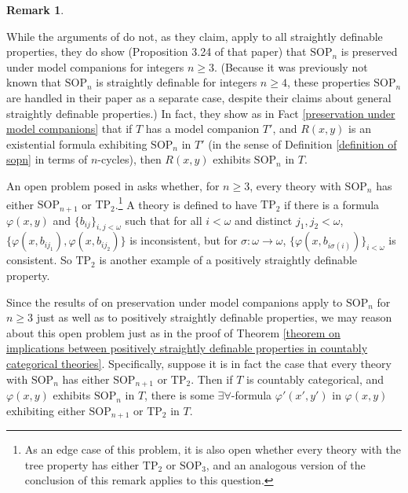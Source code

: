 \documentclass{article}
\theoremstyle{definition}
\theoremstyle{definition}
\theoremstyle{definition}
\newtheorem{remark}{Remark}
\begin{document}
\begin{remark}\label{preservation of sopn}

While the arguments of \cite{bodirsky2025taking} do not, as they claim, apply to all straightly definable properties, they do show (Proposition 3.24 of that paper) that $\mathrm{SOP}_{n}$ is preserved under model companions for integers $n \geq 3$. (Because it was previously not known that $\mathrm{SOP}_{n}$ is straightly definable for integers $n \geq 4$, these properties $\mathrm{SOP}_{n}$ are handled in their paper as a separate case, despite their claims about general straightly definable properties.) In fact, they show as in Fact \ref{preservation under model companions} that if $T$ has a model companion $T'$, and $R(x,y)$ is an existential formula exhibiting $\mathrm{SOP}_{n}$ in $T'$ (in the sense of Definition \ref{definition of sopn} in terms of $n$-cycles), then $R(x, y)$ exhibits $\mathrm{SOP}_{n}$ in $T$.


An open problem posed in \cite{chernikov2014theories} asks whether, for $n \geq 3$, every theory with $\mathrm{SOP}_{n}$ has either $\mathrm{SOP}_{n+1}$ or $\mathrm{TP}_{2}$.\footnote{As an edge case of this problem, it is also open whether every theory with the tree property has either $\mathrm{TP}_{2}$ or $\mathrm{SOP}_{3}$, and an analogous version of the conclusion of this remark applies to this question.} A theory is defined to have $\mathrm{TP}_{2}$ if there is a formula $\varphi(x, y)$ and $\{b_{ij}\}_{i, j < \omega}$ such that for all $i< \omega$ and distinct $j_{1}, j_{2}< \omega$, $\{\varphi(x, b_{ij_{1}}), \varphi(x, b_{ij_{2}})\}$ is inconsistent, but for $\sigma: \omega \to \omega$, $\{\varphi(x, b_{i\sigma(i)})\}_{i < \omega}$ is consistent. So $\mathrm{TP}_{2}$ is another example of a positively straightly definable property.

Since the results of \cite{bodirsky2025taking} on preservation under model companions apply to $\mathrm{SOP}_{n}$ for $n \geq 3$ just as well as to positively straightly definable properties, we may reason about this open problem just as in the proof of Theorem \ref{theorem on implications between positively straightly definable properties in countably categorical theories}. Specifically, suppose it is in fact the case that every theory with $\mathrm{SOP}_{n}$ has either $\mathrm{SOP}_{n+1}$ or $\mathrm{TP}_{2}$. Then if $T$ is countably categorical, and $\varphi(x, y)$ exhibits $\mathrm{SOP}_{n}$ in $T$, there is some $\exists\forall$-formula $\varphi'(x', y')$ in $\varphi(x, y)$ exhibiting either $\mathrm{SOP}_{n+1}$ or $\mathrm{TP}_{2}$ in $T$.


\end{remark}
\end{document}
